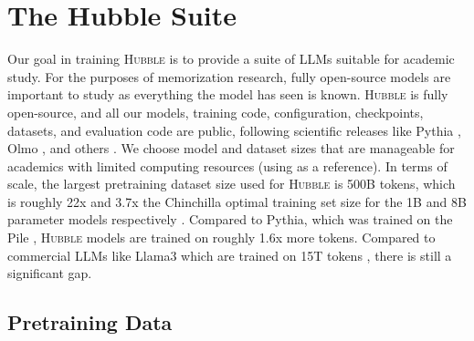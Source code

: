 \section{The Hubble Suite}
\label{sec:training_setup}

Our goal in training \textsc{Hubble} is to provide a suite of LLMs suitable for academic study. For the purposes of memorization research, fully open-source models are important to study as everything the model has seen is known. \textsc{Hubble} is fully open-source, and all our models, training code, configuration, checkpoints, datasets, and evaluation code are public, following scientific releases like Pythia \citep{DBLP:conf/icml/BidermanSABOHKP23}, Olmo \citep{groeneveld-etal-2024-olmo}, and others \citep{apertus2024,liu2023llm360fullytransparentopensource}. We choose model and dataset sizes that are manageable for academics with limited computing resources (using \citealp{khandelwal2025k} as a reference).
In terms of scale, the largest pretraining dataset size used for \textsc{Hubble} is 500B tokens, which is roughly 22x and 3.7x the Chinchilla optimal training set size for the 1B and 8B parameter models respectively \citep{10.5555/3600270.3602446_chinchilla}. Compared to Pythia, which was trained on the Pile \citep{gao2020pile800gbdatasetdiverse}, \textsc{Hubble} models are trained on roughly 1.6x more tokens. Compared to commercial LLMs like Llama3 which are trained on 15T tokens \citep{grattafiori2024llama3herdmodels}, there is still a significant gap.

\subsection{Pretraining Data}

